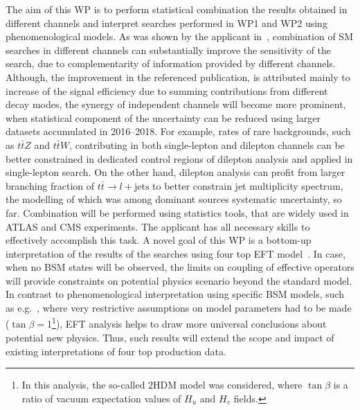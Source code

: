 \textcolor{\mynew}{
The aim of this WP is to perform statistical combination the results obtained in different channels and interpret searches performed in WP1 and WP2 using phenomenological models. As was shown by the applicant in~\cite{Sirunyan:2017tep}, combination of SM \tttt searches in different channels can substantially improve the sensitivity of the search, due to complementarity of information provided by different channels. Although, the improvement in the referenced publication, is attributed mainly to increase of the signal efficiency due to summing contributions from different decay modes, the synergy of independent channels will become more prominent, when statistical component of the uncertainty can be reduced using larger datasets accumulated in 2016--2018. For example, rates of rare backgrounds, such as $t\bar{t}Z$ and $t\bar{t}W$, contributing in both single-lepton and dilepton channels can be better constrained in dedicated control regions of dilepton analysis and applied in single-lepton search. On the other hand, dilepton analysis can profit from larger branching fraction of $t\bar{t} \rightarrow l+\mathrm{jets}$ to better constrain jet multiplicity spectrum, the modelling of which was among dominant sources systematic uncertainty, so far. Combination will be performed using statistics tools, that are widely used in ATLAS and CMS experiments. The applicant has all necessary skills to effectively accomplish this task.
}
\textcolor{\mynew}{
A novel goal of this WP is a bottom-up interpretation of the results of the searches using four top EFT model~\cite{DegrandeEFTthesis}. In case, when no BSM states will be observed, the limits on coupling of effective operators will provide constraints on potential physics scenario beyond the standard model. In contrast to phenomenological interpretation using specific BSM models, such as e.g.~\cite{Sirunyan:2017uyt}, where very restrictive assumptions on model parameters had to be made ($\tan \beta=$1\footnote{In this analysis, the so-called 2HDM model was considered, where $\tan \beta$ is a ratio of vacuum expectation values of $H_u$ and $H_v$ fields.}), EFT analysis helps to draw more universal conclusions about potential new physics. Thus, such results will extend the scope and impact of existing interpretations of four top production data. 
}
